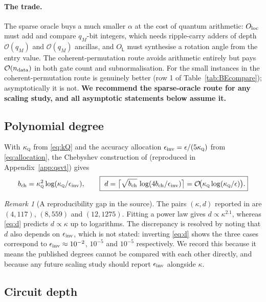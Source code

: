 \documentclass[11pt,a4paper]{article}
\theoremstyle{plain}
\theoremstyle{definition}
\theoremstyle{remark}
\newtheorem{remark}[proposition]{Remark}
\newcommand{\Oh}{\mathcal{O}}
\newcommand{\Lmat}{\mathsf{L}}
\newcommand{\kQ}{\kappa_{\textsc{q}}}
\begin{document}
\paragraph{The trade.}  The sparse oracle buys a much smaller $\alpha$ at the
cost of quantum arithmetic: $O_{\rm loc}$ must add and compare $q_M$-bit
integers, which needs ripple-carry adders of depth $\Oh(q_M)$ and $\Oh(q_M)$
ancillas, and $O_{\Lmat}$ must synthesise a rotation angle from the entry value.
The coherent-permutation route avoids arithmetic entirely but pays $\Oh(n_{\rm data})$
in both gate count and subnormalisation.  For the small instances in
\cite{Setty2026} the coherent-permutation route is genuinely better
(row 1 of Table~\ref{tab:BEcompare}); asymptotically it is not.  \textbf{We
recommend the sparse-oracle route for any scaling study, and all asymptotic
statements below assume it.}

\subsection{Polynomial degree}
\label{sec:degree}

With $\kQ$ from \eqref{eq:kQ} and the accuracy allocation
$\epsilon_{\rm inv}=\epsilon/(5\kQ)$ from \eqref{eq:allocation}, the Chebyshev
construction of \cite[Appendix~B]{Setty2026} (reproduced in
Appendix~\ref{app:qsvt}) gives
\begin{equation}
b_{\rm ch}=\kQ^{2}\log(\kQ/\epsilon_{\rm inv}),
\qquad
\boxed{\ d=\bigl\lceil\sqrt{b_{\rm ch}}\,\log(4b_{\rm ch}/\epsilon_{\rm inv})\bigr\rceil
=\Oh\!\bigl(\kQ\log(\kQ/\epsilon)\bigr).}
\label{eq:d}
\end{equation}

\begin{remark}[A reproducibility gap in the source]
The pairs $(\kappa,d)$ reported in \cite{Setty2026} are
$(4,117)$, $(8,559)$ and $(12,1275)$.  Fitting a power law gives $d\propto\kappa^{2.1}$,
whereas \eqref{eq:d} predicts $d\propto\kappa$ up to logarithms.  The
discrepancy is resolved by noting that $d$ also depends on
$\epsilon_{\rm inv}$, which is not stated: inverting \eqref{eq:d} shows the
three cases correspond to $\epsilon_{\rm inv}\approx10^{-2}$, $10^{-5}$ and
$10^{-5}$ respectively.  We record this because it means the published degrees
cannot be compared with each other directly, and because any future scaling
study should report $\epsilon_{\rm inv}$ alongside $\kappa$.
\end{remark}

\subsection{Circuit depth}
\label{sec:depth}
\end{document}
